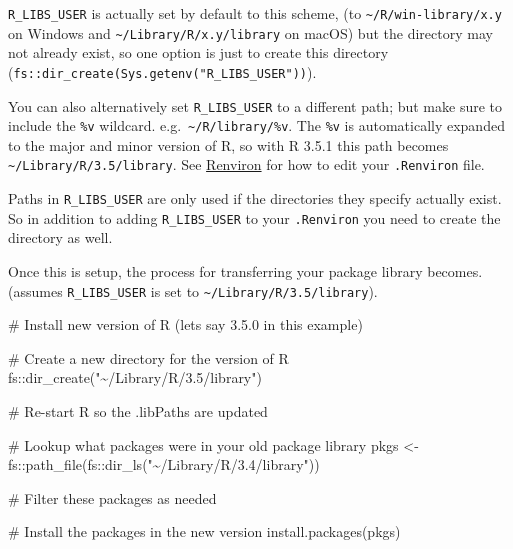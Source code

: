 \documentclass[
  letterpaper,
]{book}
\newenvironment{Shaded}{\begin{snugshade}}{\end{snugshade}}
\newcommand{\CommentTok}[1]{\textcolor[rgb]{0.37,0.37,0.37}{#1}}
\newcommand{\FunctionTok}[1]{\textcolor[rgb]{0.28,0.35,0.67}{#1}}
\newcommand{\NormalTok}[1]{\textcolor[rgb]{0.00,0.23,0.31}{#1}}
\newcommand{\OtherTok}[1]{\textcolor[rgb]{0.00,0.23,0.31}{#1}}
\newcommand{\SpecialCharTok}[1]{\textcolor[rgb]{0.37,0.37,0.37}{#1}}
\newcommand{\StringTok}[1]{\textcolor[rgb]{0.13,0.47,0.30}{#1}}
\begin{document}
\texttt{R\_LIBS\_USER} is actually set by default to this scheme, (to
\texttt{\textasciitilde{}/R/win-library/x.y} on Windows and
\texttt{\textasciitilde{}/Library/R/x.y/library} on macOS) but the
directory may not already exist, so one option is just to create this
directory (\texttt{fs::dir\_create(Sys.getenv("R\_LIBS\_USER"))}).

You can also alternatively set \texttt{R\_LIBS\_USER} to a different
path; but make sure to include the \texttt{\%v} wildcard.
e.g.~\texttt{\textasciitilde{}/R/library/\%v}. The \texttt{\%v} is
automatically expanded to the major and minor version of R, so with R
3.5.1 this path becomes
\texttt{\textasciitilde{}/Library/R/3.5/library}. See
\protect\hyperlink{renviron}{Renviron} for how to edit your
\texttt{.Renviron} file.

\begin{rmdwarning}
Paths in \texttt{R\_LIBS\_USER} are only used if the directories they
specify actually exist. So in addition to adding \texttt{R\_LIBS\_USER}
to your \texttt{.Renviron} you need to create the directory as well.
\end{rmdwarning}

Once this is setup, the process for transferring your package library
becomes. (assumes \texttt{R\_LIBS\_USER} is set to
\texttt{\textasciitilde{}/Library/R/3.5/library}).

\begin{Shaded}
\begin{Highlighting}[]
\CommentTok{\# Install new version of R (lets say 3.5.0 in this example)}

\CommentTok{\# Create a new directory for the version of R}
\NormalTok{fs}\SpecialCharTok{::}\FunctionTok{dir\_create}\NormalTok{(}\StringTok{"\textasciitilde{}/Library/R/3.5/library"}\NormalTok{)}

\CommentTok{\# Re{-}start R so the .libPaths are updated}

\CommentTok{\# Lookup what packages were in your old package library}
\NormalTok{pkgs }\OtherTok{\textless{}{-}}\NormalTok{ fs}\SpecialCharTok{::}\FunctionTok{path\_file}\NormalTok{(fs}\SpecialCharTok{::}\FunctionTok{dir\_ls}\NormalTok{(}\StringTok{"\textasciitilde{}/Library/R/3.4/library"}\NormalTok{))}

\CommentTok{\# Filter these packages as needed}

\CommentTok{\# Install the packages in the new version}
\FunctionTok{install.packages}\NormalTok{(pkgs)}
\end{Highlighting}
\end{Shaded}
\end{document}
